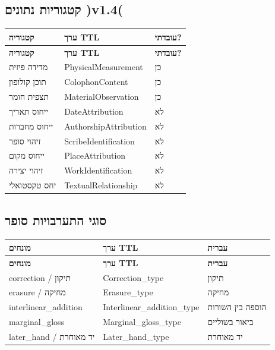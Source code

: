 \documentclass[12pt,a4paper]{article}
\begin{document}
\subsection{קטגוריות נתונים )v1.4(}

\begin{longtable}{|p{4cm}|L{5cm}|L{7cm}|}
\hline
\textbf{קטגוריה} & \textbf{ערך TTL} & \textbf{עובדתי?} \\
\hline
\endfirsthead
\hline
\textbf{קטגוריה} & \textbf{ערך TTL} & \textbf{עובדתי?} \\
\hline
\endhead
\hline
\endfoot
מדידה פיזית & PhysicalMeasurement & כן \\
\hline
תוכן קולופון & ColophonContent & כן \\
\hline
תצפית חומר & MaterialObservation & כן \\
\hline
ייחוס תאריך & DateAttribution & לא \\
\hline
ייחוס מחברות & AuthorshipAttribution & לא \\
\hline
זיהוי סופר & ScribeIdentification & לא \\
\hline
ייחוס מקום & PlaceAttribution & לא \\
\hline
זיהוי יצירה & WorkIdentification & לא \\
\hline
יחס טקסטואלי & TextualRelationship & לא \\
\hline
\end{longtable}

\subsection{סוגי התערבויות סופר}

\begin{longtable}{|p{4cm}|L{5cm}|L{7cm}|}
\hline
\textbf{מונחים} & \textbf{ערך TTL} & \textbf{עברית} \\
\hline
\endfirsthead
\hline
\textbf{מונחים} & \textbf{ערך TTL} & \textbf{עברית} \\
\hline
\endhead
\hline
\endfoot
correction / תיקון & Correction\_type & תיקון \\
\hline
erasure / מחיקה & Erasure\_type & מחיקה \\
\hline
interlinear\_addition & Interlinear\_addition\_type & הוספה בין השורות \\
\hline
marginal\_gloss & Marginal\_gloss\_type & ביאור בשוליים \\
\hline
later\_hand / יד מאוחרת & Later\_hand\_type & יד מאוחרת \\
\hline
\end{longtable}
\end{document}
